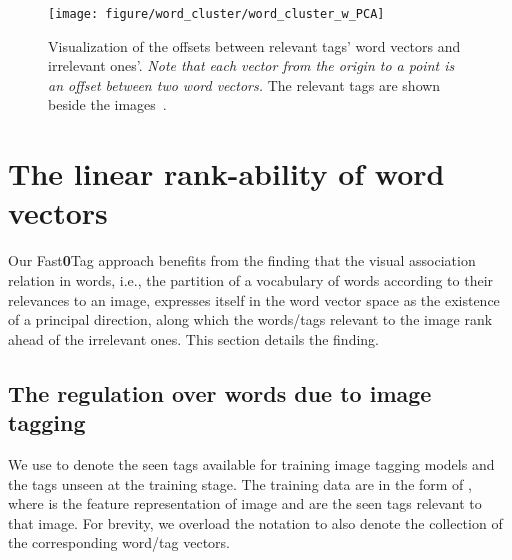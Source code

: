 \documentclass[10pt,twocolumn,letterpaper]{article}
\newcommand{\eat}[1]{{}}
\begin{document}
 


\begin{figure*}
\centering
\vspace{-12pt}
\texttt{[image: figure/word\_cluster/word\_cluster\_w\_PCA]}
   \caption{Visualization  of the offsets between relevant tags\rq{} word vectors and irrelevant ones\rq{}. \emph{Note that each vector from the origin to a point is an offset between two word vectors.}
   The relevant tags are shown beside the images~\cite{chua_nus-wide:_2009}. }
\label{fVisualize}
\vspace{-12pt}
\end{figure*}




\section{The linear rank-ability of word vectors}
\label{sRankability}
Our Fast\textbf{0}Tag approach benefits from the finding that the visual association relation in words, i.e., the partition of a vocabulary of words according to their relevances to an image,  expresses itself in the word vector space as the existence of a principal direction, along which the words/tags relevant to the image rank ahead of the irrelevant ones. This section details the finding.




\eat{
In this paper, we proposed a general framework which learns how to rank items in continuous spaces for a given query in another space and modality. We could incorporate any ranking loss functions into this framework. In this case we provide a way to extend conventional ranking problem from being discrete to being continuous. And we tested this approach by applying it to the problem of newly proposed zero-shot ranking problem, where we need to rank some unseen labels for given query images.
}





\subsection{The regulation over words due to image tagging} 
\label{sRegulation}
We use  to denote the seen tags available for training image tagging models and  the tags unseen at the training stage.  The training data are in the form of , where  is the feature representation of  image  and  are the seen tags relevant to that image. For brevity, we overload the notation  to also denote the collection of the corresponding word/tag vectors. 
\end{document}
